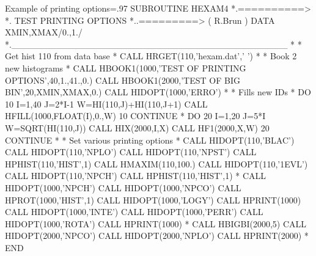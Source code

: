 \newpage
\begin{XMPt}{Example of printing options}\baselineskip=.97\baselineskip\relax
      SUBROUTINE HEXAM4
*.==========>
*.           TEST PRINTING OPTIONS
*..=========> ( R.Brun )
      DATA XMIN,XMAX/0.,1./
*.___________________________________________
*
*             Get hist 110 from data base
*
      CALL HRGET(110,'hexam.dat',' ')
*
*             Book 2 new histograms
*
      CALL HBOOK1(1000,'TEST OF PRINTING OPTIONS',40,1.,41.,0.)
      CALL HBOOK1(2000,'TEST OF BIG BIN',20,XMIN,XMAX,0.)
      CALL HIDOPT(1000,'ERRO')
*
*             Fills new IDs
*
      DO 10 I=1,40
         J=2*I-1
         W=HI(110,J)+HI(110,J+1)
         CALL HFILL(1000,FLOAT(I),0.,W)
  10  CONTINUE
*
      DO 20 I=1,20
         J=5*I
         W=SQRT(HI(110,J))
         CALL HIX(2000,I,X)
         CALL HF1(2000,X,W)
  20  CONTINUE
*
*             Set various printing options
*
      CALL HIDOPT(110,'BLAC')
      CALL HIDOPT(110,'NPLO')
      CALL HIDOPT(110,'NPST')
      CALL HPHIST(110,'HIST',1)
      CALL HMAXIM(110,100.)
      CALL HIDOPT(110,'1EVL')
      CALL HIDOPT(110,'NPCH')
      CALL HPHIST(110,'HIST',1)
*
      CALL HIDOPT(1000,'NPCH')
      CALL HIDOPT(1000,'NPCO')
      CALL HPROT(1000,'HIST',1)
      CALL HIDOPT(1000,'LOGY')
      CALL HPRINT(1000)
      CALL HIDOPT(1000,'INTE')
      CALL HIDOPT(1000,'PERR')
      CALL HIDOPT(1000,'ROTA')
      CALL HPRINT(1000)
*
      CALL HBIGBI(2000,5)
      CALL HIDOPT(2000,'NPCO')
      CALL HIDOPT(2000,'NPLO')
      CALL HPRINT(2000)
*
      END
\end{XMPt}
\bigskip
